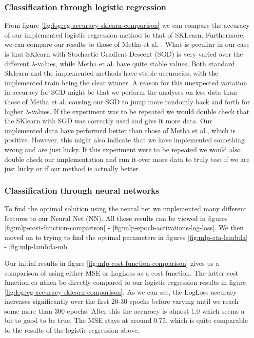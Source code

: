 \subsubsection{Classification through logistic regression}
From figure \ref{fig:logreg-accuracy-sklearn-comparison} we can compare the accuracy of our implemented logistic regression method to that of SKLearn. Furthermore, we can compare our results to those of Metha et al. \cite{2018arXiv180308823M}. What is peculiar in our case is that SKlearn with Stochastic Gradient Descent (SGD) is very varied over the different $\lambda$-values, while Metha et al. have quite stable values. Both standard SKlearn and the implemented methods have stable accuracies, with the implemented train being the clear winner. A reason for this unexpected variation in accuracy for SGD might be that we perform the analyses on less data than those of Metha et al. causing our SGD to jump more randomly back and forth for higher $\lambda$-values. If the experiment was to be repeated we would double check that the SKlearn with SGD was correctly used and give it more data. Our implemented data have performed better than those of Metha et al., which is positive. However, this might also indicate that we have implemented something wrong and are just lucky. If this experiment were to be repeated we would also double check our implementation and run it over more data to truly test if we are just lucky or if our method is actually better.

\subsubsection{Classification through neural networks}
To find the optimal solution using the neural net we implemented many different features to our Neural Net (NN). All these results can be viewed in figures \ref{fig:mlp-cost-function-comparison} - \ref{fig:mlp-epoch-activations-log-loss}. We then moved on to trying to find the optimal parameters in figures \ref{fig:mlp-eta-lambda} - \ref{fig:mlp-lambda-mb}. 

Our initial results in figure \ref{fig:mlp-cost-function-comparison} gives us a comparison of using either MSE or LogLoss as a cost function. The latter cost function ca nthen be directly compared to our logistic regression results in figure \ref{fig:logreg-accuracy-sklearn-comparison}. As we can see, the LogLoss accuracy increases significantly over the first 20-30 epochs before varying until we reach some more than 300 epochs. After this the accuracy is almost 1.0 which seems a bit to good to be true. The MSE stays at around 0.75, which is quite comparable to the results of the logistic regression above. 

